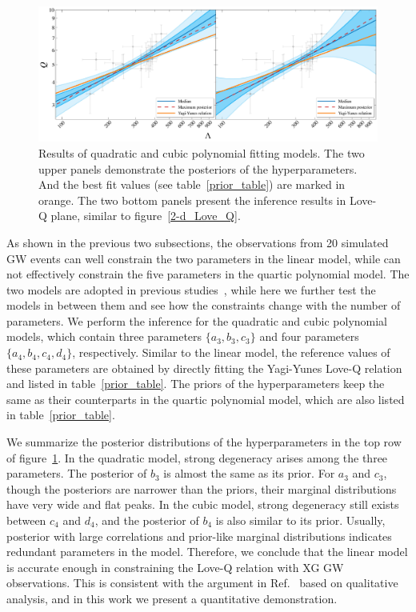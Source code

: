 \documentclass[a4paper,11pt]{article}
\begin{document}
\begin{figure}
    \begin{minipage}[t]{\textwidth}
    \includegraphics[width=\linewidth]{hierarchical_results_APR4_3d.pdf}
    \end{minipage}
    \caption{\label{3-d_4-d_Love_Q} Results of quadratic and cubic polynomial fitting models. The two upper panels demonstrate the posteriors of the hyperparameters. And the best fit values (see table~\ref{prior_table}) are marked in orange. The two bottom panels present the inference results in Love-Q plane, similar to figure~\ref{2-d_Love_Q}.
    }
\end{figure}
As shown in the previous two subsections, the observations from 20 simulated GW events can well constrain the two parameters in the linear model, while can not effectively constrain the five parameters in the quartic polynomial model. The two models are adopted in previous studies~\cite{Yagi:2013awa, Samajdar:2020xrd}, while here we further test the models in between them and see how the constraints change with the number of parameters. We perform the inference for the quadratic and cubic polynomial models, which contain three parameters $\{a_3, b_3, c_3\}$ and four parameters $\{a_4, b_4, c_4, d_4\}$, respectively. Similar to the linear model, the reference values of these parameters are obtained by directly fitting the Yagi-Yunes Love-Q relation and listed in table~\ref{prior_table}. The priors of the
hyperparameters keep the same as their counterparts in the quartic polynomial model, which are also listed in table~\ref{prior_table}.

We summarize the posterior distributions of the hyperparameters in the top row of figure~\ref{3-d_4-d_Love_Q}. In the quadratic model, strong degeneracy arises among the three parameters. The posterior of $b_3$ is almost the same as its prior. For $a_3$ and $c_3$, though the posteriors are narrower than the priors, their marginal distributions have very wide and flat peaks. In the cubic model, strong degeneracy still exists between $c_4$ and $d_4$, and the posterior of $b_4$ is also similar to its prior. Usually, posterior with large correlations and prior-like marginal distributions indicates redundant parameters in the model. Therefore, we conclude that the linear model is accurate enough in constraining the Love-Q relation with XG GW observations. This is consistent with the argument in Ref.~\cite{Samajdar:2020xrd} based on qualitative analysis, and in this work we present a quantitative demonstration. 
\end{document}
